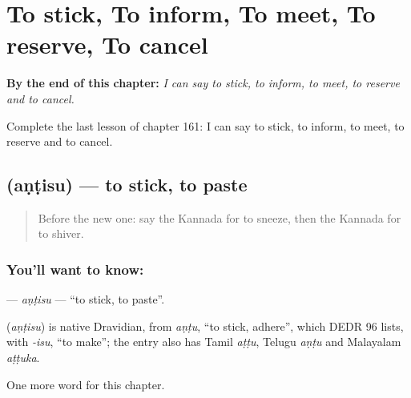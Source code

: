 
\chapter{To stick, To inform, To meet, To reserve, To cancel}
\label{ch:ka-to-stick-to-inform-to-meet-to-reserve-to-cancel}

\begin{chapteropening}
\textbf{By the end of this chapter:} \emph{I can say to stick, to inform, to meet, to reserve and to cancel.}

Complete the last lesson of chapter 161: I can say to stick, to inform, to meet, to reserve and to cancel.
\end{chapteropening}

\section[\texorpdfstring{\kn{ಅಂಟಿಸು} (aṇṭisu)}{ಅಂಟಿಸು (aṇṭisu)}]{ (aṇṭisu) — to stick, to paste}

\label{lesson:KA-C161-antisu}



\begin{quote}
Before the new one: say the Kannada for to sneeze, then the Kannada for to shiver.
\end{quote}

\subsection*{You'll want to know: }
\textbf{} — \emph{aṇṭisu} — \textquotedblleft{}to stick, to paste\textquotedblright{}.

\begin{cousinweb}
\textbf{} (\emph{aṇṭisu}) is native Dravidian, from \emph{aṇṭu}, \textquotedblleft{}to stick, adhere\textquotedblright{}, which DEDR 96 lists, with \emph{-isu}, \textquotedblleft{}to make\textquotedblright{}; the entry also has Tamil \emph{aṭṭu}, Telugu \emph{aṇṭu} and Malayalam \emph{aṭṭuka}.
\end{cousinweb}

\begin{grammarlens}[title={What you've built}]
One more word for this chapter.
\end{grammarlens}

